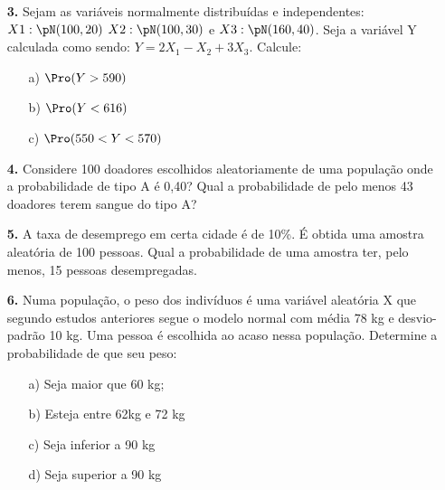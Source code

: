 \begin{itemize}
	\item[\textbf{3.}] Sejam as variáveis normalmente distribuídas e independentes: $X1: \pN(100, 20)$ $X2: \pN(100, 30)$ e $X3: \pN(160, 40)$. Seja a variável Y calculada como sendo: $Y= 2X_1-X_2+3X_3$. Calcule:
		\begin{itemize}
		\item[a)]$\Pro(Y>590)$
	        \resposta{}
		\item[b)] $\Pro(Y<616)$
		    \resposta{}
		\item[c)] $\Pro(550<Y<570)$
		    \resposta{}
	\end{itemize}
	
	\item[\textbf{4.}] Considere 100 doadores escolhidos aleatoriamente de uma população onde a probabilidade de tipo A é 0,40? Qual a probabilidade de pelo menos 43 doadores terem sangue do tipo A?
	
	\item[\textbf{5.}] A taxa de desemprego em certa cidade é de 10\%. É obtida uma amostra aleatória de 100 pessoas. Qual a probabilidade de uma amostra ter, pelo menos, 15 pessoas desempregadas.
	
	\item[\textbf{6.}] Numa população, o peso dos indivíduos é uma variável aleatória X que segundo estudos anteriores segue o modelo normal com média 78 kg e desvio-padrão 10 kg. Uma pessoa é escolhida ao acaso nessa população. Determine a probabilidade de que seu peso:
		\begin{itemize}
		\item[a)] Seja maior que 60 kg;
	        \resposta{}
		\item[b)] Esteja entre 62kg e 72 kg
		    \resposta{}
		\item[c)] Seja inferior a 90 kg
		    \resposta{}
		\item[d)] Seja superior a 90 kg
		    \resposta{}
	\end{itemize}
	
\end{itemize}